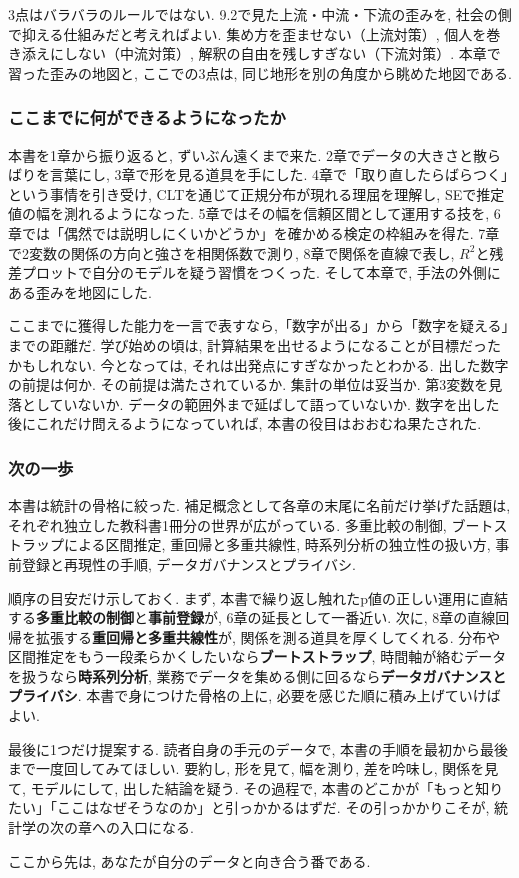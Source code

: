 3点はバラバラのルールではない.
9.2で見た上流・中流・下流の歪みを, 社会の側で抑える仕組みだと考えればよい.
集め方を歪ませない（上流対策）, 個人を巻き添えにしない（中流対策）, 解釈の自由を残しすぎない（下流対策）.
本章で習った歪みの地図と, ここでの3点は, 同じ地形を別の角度から眺めた地図である.

\subsubsection*{ここまでに何ができるようになったか}

本書を1章から振り返ると, ずいぶん遠くまで来た.
2章でデータの大きさと散らばりを言葉にし, 3章で形を見る道具を手にした.
4章で「取り直したらばらつく」という事情を引き受け, CLTを通じて正規分布が現れる理屈を理解し, SEで推定値の幅を測れるようになった.
5章ではその幅を信頼区間として運用する技を, 6章では「偶然では説明しにくいかどうか」を確かめる検定の枠組みを得た.
7章で2変数の関係の方向と強さを相関係数で測り, 8章で関係を直線で表し, $R^2$と残差プロットで自分のモデルを疑う習慣をつくった.
そして本章で, 手法の外側にある歪みを地図にした.

ここまでに獲得した能力を一言で表すなら,「数字が出る」から「数字を疑える」までの距離だ.
学び始めの頃は, 計算結果を出せるようになることが目標だったかもしれない.
今となっては, それは出発点にすぎなかったとわかる.
出した数字の前提は何か. その前提は満たされているか. 集計の単位は妥当か. 第3変数を見落としていないか. データの範囲外まで延ばして語っていないか.
数字を出した後にこれだけ問えるようになっていれば, 本書の役目はおおむね果たされた.

\subsubsection*{次の一歩}

本書は統計の骨格に絞った. 補足概念として各章の末尾に名前だけ挙げた話題は, それぞれ独立した教科書1冊分の世界が広がっている.
多重比較の制御, ブートストラップによる区間推定, 重回帰と多重共線性, 時系列分析の独立性の扱い方, 事前登録と再現性の手順, データガバナンスとプライバシ.

順序の目安だけ示しておく.
まず, 本書で繰り返し触れたp値の正しい運用に直結する\textbf{多重比較の制御}と\textbf{事前登録}が, 6章の延長として一番近い.
次に, 8章の直線回帰を拡張する\textbf{重回帰と多重共線性}が, 関係を測る道具を厚くしてくれる.
分布や区間推定をもう一段柔らかくしたいなら\textbf{ブートストラップ}, 時間軸が絡むデータを扱うなら\textbf{時系列分析}, 業務でデータを集める側に回るなら\textbf{データガバナンスとプライバシ}.
本書で身につけた骨格の上に, 必要を感じた順に積み上げていけばよい.

最後に1つだけ提案する.
読者自身の手元のデータで, 本書の手順を最初から最後まで一度回してみてほしい.
要約し, 形を見て, 幅を測り, 差を吟味し, 関係を見て, モデルにして, 出した結論を疑う.
その過程で, 本書のどこかが「もっと知りたい」「ここはなぜそうなのか」と引っかかるはずだ.
その引っかかりこそが, 統計学の次の章への入口になる.

ここから先は, あなたが自分のデータと向き合う番である.
